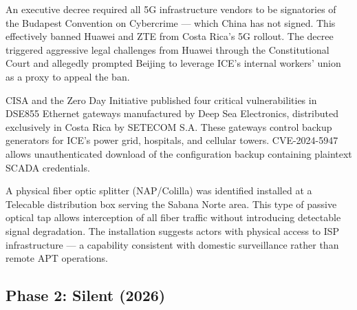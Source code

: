 \documentclass[11pt,a4paper]{article}
\begin{document}
\begin{description}[style=nextline, leftmargin=1.5cm]

\item[\textcolor{phase1}{2023-08} --- Budapest Convention 5G Decree]
An executive decree required all 5G infrastructure vendors to be signatories of the Budapest Convention on Cybercrime --- which China has not signed. This effectively banned Huawei and ZTE from Costa Rica's 5G rollout. The decree triggered aggressive legal challenges from Huawei through the Constitutional Court and allegedly prompted Beijing to leverage ICE's internal workers' union as a proxy to appeal the ban.

\item[\textcolor{phase1}{2024-06} --- CISA/ZDI Publish DSE855 CVEs]
CISA and the Zero Day Initiative published four critical vulnerabilities in DSE855 Ethernet gateways manufactured by Deep Sea Electronics, distributed exclusively in Costa Rica by SETECOM S.A. These gateways control backup generators for ICE's power grid, hospitals, and cellular towers. CVE-2024-5947 allows unauthenticated download of the configuration backup containing plaintext SCADA credentials.

\item[\textcolor{phase1}{2025-06-21} --- Fiber Splitter Installed]
A physical fiber optic splitter (NAP/Colilla) was identified installed at a Telecable distribution box serving the Sabana Norte area. This type of passive optical tap allows interception of all fiber traffic without introducing detectable signal degradation. The installation suggests actors with physical access to ISP infrastructure --- a capability consistent with domestic surveillance rather than remote APT operations.

\end{description}

\subsection{Phase 2: Silent (2026)}
\end{document}
